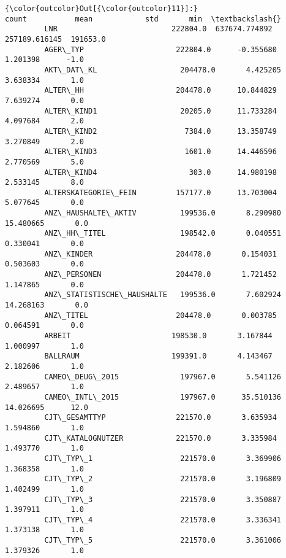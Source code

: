 \documentclass[11pt]{article}
\begin{document}
\begin{Verbatim}[commandchars=\\\{\}]
{\color{outcolor}Out[{\color{outcolor}11}]:}                                 count           mean            std       min  \textbackslash{}
         LNR                          222804.0  637674.774892  257189.616145  191653.0   
         AGER\_TYP                     222804.0      -0.355680       1.201398      -1.0   
         AKT\_DAT\_KL                   204478.0       4.425205       3.638334       1.0   
         ALTER\_HH                     204478.0      10.844829       7.639274       0.0   
         ALTER\_KIND1                   20205.0      11.733284       4.097684       2.0   
         ALTER\_KIND2                    7384.0      13.358749       3.270849       2.0   
         ALTER\_KIND3                    1601.0      14.446596       2.770569       5.0   
         ALTER\_KIND4                     303.0      14.980198       2.533145       8.0   
         ALTERSKATEGORIE\_FEIN         157177.0      13.703004       5.077645       0.0   
         ANZ\_HAUSHALTE\_AKTIV          199536.0       8.290980      15.480665       0.0   
         ANZ\_HH\_TITEL                 198542.0       0.040551       0.330041       0.0   
         ANZ\_KINDER                   204478.0       0.154031       0.503603       0.0   
         ANZ\_PERSONEN                 204478.0       1.721452       1.147865       0.0   
         ANZ\_STATISTISCHE\_HAUSHALTE   199536.0       7.602924      14.268163       0.0   
         ANZ\_TITEL                    204478.0       0.003785       0.064591       0.0   
         ARBEIT                       198530.0       3.167844       1.000997       1.0   
         BALLRAUM                     199391.0       4.143467       2.182606       1.0   
         CAMEO\_DEUG\_2015              197967.0       5.541126       2.489657       1.0   
         CAMEO\_INTL\_2015              197967.0      35.510136      14.026695      12.0   
         CJT\_GESAMTTYP                221570.0       3.635934       1.594860       1.0   
         CJT\_KATALOGNUTZER            221570.0       3.335984       1.493770       1.0   
         CJT\_TYP\_1                    221570.0       3.369906       1.368358       1.0   
         CJT\_TYP\_2                    221570.0       3.196809       1.402499       1.0   
         CJT\_TYP\_3                    221570.0       3.350887       1.397911       1.0   
         CJT\_TYP\_4                    221570.0       3.336341       1.373138       1.0   
         CJT\_TYP\_5                    221570.0       3.361006       1.379326       1.0   

\end{Verbatim}
\end{document}
